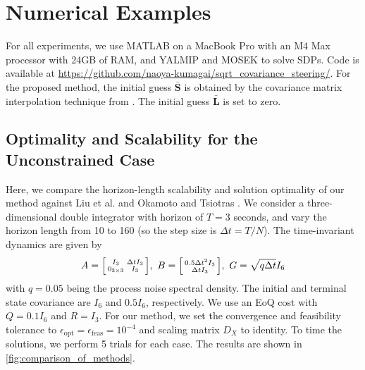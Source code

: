 \section{Numerical Examples}
For all experiments, we use MATLAB on a MacBook Pro with an M4 Max processor with 24GB of RAM, and  YALMIP \cite{lofbergYALMIPToolboxModeling2004} and MOSEK \cite{mosekapsMOSEKOptimizationToolbox2025} to solve SDPs. 
Code is available at {\small \url{https://github.com/naoya-kumagai/sqrt_covariance_steering/}}.
For the proposed method, the initial guess \( \bar{\bm{S}} \) is obtained by the covariance matrix interpolation technique from \cite{linRiemannianGeometrySymmetric2019}. The initial guess \( \bar{\bm{L}} \) is set to zero.


\subsection{Optimality and Scalability for the Unconstrained Case} \label{sec:comparison_unconstrained}
Here, we compare the horizon-length scalability and solution optimality of our method against Liu et al. \cite{liuOptimalCovarianceSteering2025} and Okamoto and Tsiotras \cite{okamotoOptimalStochasticVehicle2019}. We consider a three-dimensional double integrator with horizon of \(T = 3\) seconds, and vary the horizon length from 10 to 160 (so the step size is \(\Delta t = T / N\)). 
The time-invariant dynamics are given by
\begin{equation} \label{eq:double_integrator_equations}
	A = \smqty[
		I_3 & \Delta t I_3 \\
		0_{3 \times 3} & I_3
	],\ 
	B = \smqty[
		0.5 \Delta t^2 I_3 \\
		\Delta t I_3
	],\ 
	G = \sqrt{q \Delta t} I_6
\end{equation}
with \( q = 0.05 \) being the process noise spectral density.
The initial and terminal state covariance are \(I_6\) and \(0.5 I_6\), respectively. We use an EoQ cost with \(Q = 0.1 I_6\) and \(R = I_3\).
For our method, we set the convergence and feasibility tolerance to \( \epsilon_{\mathrm{opt}} = \epsilon_{\mathrm{feas}} = 10^{-4}\) and scaling matrix \(D_X\) to identity. To time the solutions, we perform 5 trials for each case. The results are shown in \cref{fig:comparison_of_methods}.

